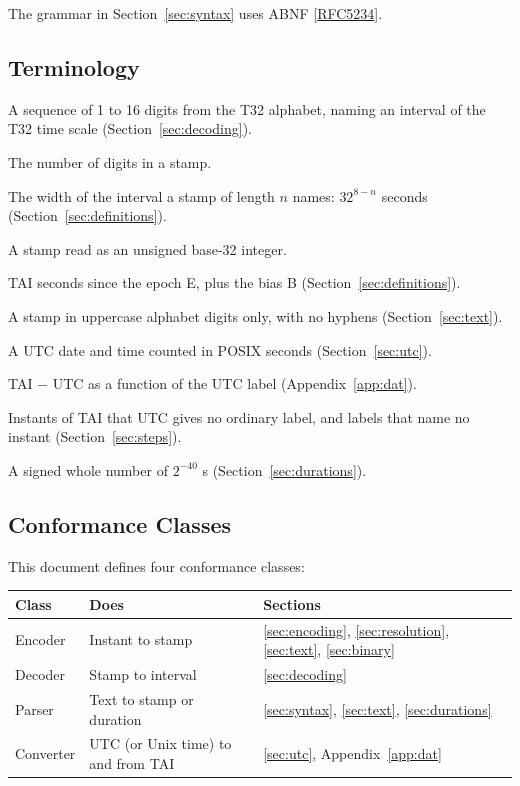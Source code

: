 \documentclass[11pt]{article}
\newcommand{\dAT}{\ensuremath{\Delta\mathrm{AT}}}
\newcommand{\pow}[2]{\ensuremath{#1^{#2}}}
\newcommand{\Sec}[1]{Section~\ref{#1}}
\newcommand{\App}[1]{Appendix~\ref{#1}}
\newcommand{\xref}[1]{[\hyperref[ref:#1]{#1}]}
\begin{document}
The grammar in \Sec{sec:syntax} uses ABNF \xref{RFC5234}.

\subsection{Terminology}\label{sec:terms}

\begin{description}[style=nextline,leftmargin=1.5em]
\item[Stamp] A sequence of 1 to 16 digits from the T32 alphabet, naming an
interval of the T32 time scale (\Sec{sec:decoding}).
\item[Length ($n$)] The number of digits in a stamp.
\item[Unit ($u(n)$)] The width of the interval a stamp of length $n$ names:
$32^{8-n}$ seconds (\Sec{sec:definitions}).
\item[Value (V)] A stamp read as an unsigned base-32 integer.
\item[Biased time] TAI seconds since the epoch E, plus the bias B
(\Sec{sec:definitions}).
\item[Canonical form] A stamp in uppercase alphabet digits only, with no
hyphens (\Sec{sec:text}).
\item[UTC label] A UTC date and time counted in POSIX seconds
(\Sec{sec:utc}).
\item[\dAT] TAI $-$ UTC as a function of the UTC label (\App{app:dat}).
\item[Inserted and removed time] Instants of TAI that UTC gives no ordinary
label, and labels that name no instant (\Sec{sec:steps}).
\item[Duration] A signed whole number of \pow{2}{-40} s
(\Sec{sec:durations}).
\end{description}

\subsection{Conformance Classes}\label{sec:classes}

This document defines four conformance classes:

\begin{center}
\begin{tabularx}{\textwidth}{@{}l>{\raggedright}p{}X@{}}
\toprule
Class & Does & Sections \\
\midrule
Encoder & Instant to stamp & \ref{sec:encoding}, \ref{sec:resolution}, \ref{sec:text}, \ref{sec:binary} \\
Decoder & Stamp to interval & \ref{sec:decoding} \\
Parser & Text to stamp or duration & \ref{sec:syntax}, \ref{sec:text}, \ref{sec:durations} \\
Converter & UTC (or Unix time) to and from TAI & \ref{sec:utc}, \App{app:dat} \\
\bottomrule
\end{tabularx}
\end{center}
\end{document}
